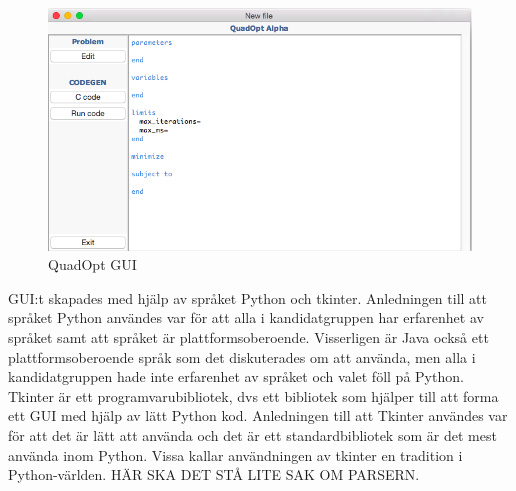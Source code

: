 \begin{figure}[h]
\centerline{\includegraphics[scale=0.58]{grafik/QuadOptGUI}}
\caption{QuadOpt GUI}
\label{fig:quadoptgui}
\end{figure}

GUI:t skapades med hjälp av språket Python och tkinter. Anledningen till att språket Python användes var för att alla i kandidatgruppen har erfarenhet av språket samt att språket är plattformsoberoende. Visserligen är Java också ett plattformsoberoende språk som det diskuterades om att använda, men alla i kandidatgruppen hade inte erfarenhet av språket och valet föll på Python.
\newline
\newline
Tkinter är ett programvarubibliotek, dvs ett bibliotek som hjälper till att forma ett GUI med hjälp av lätt Python kod. Anledningen till att Tkinter användes var för att det är lätt att använda och det är ett standardbibliotek som är det mest använda inom Python. Vissa kallar användningen av tkinter en tradition i Python-världen.
\newline
\newline
HÄR SKA DET STÅ LITE SAK OM PARSERN. 
